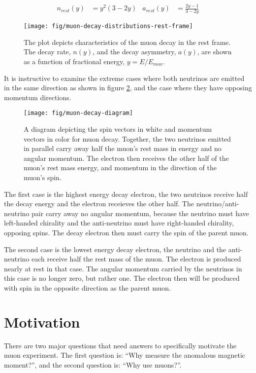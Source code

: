 \begin{align}
\label{eqn:muon-decay-rest-frame}
n_{rest}(y) & = y^2(3 - 2 y) & a_{rest}(y) & = \frac{2 y - 1}{3 - 2y}
\end{align}

\begin{figure}
\centering
\texttt{[image: fig/muon-decay-distributions-rest-frame]}
\caption{
    The plot depicts characteristics of the muon decay in the rest frame.  The decay rate, $n(y)$, and the decay asymmetry, $a(y)$, are shown as a function of fractional energy, $y=E/E_{max}$.
    \label{fig:muon-decay-rest-frame}
}
\end{figure}

It is instructive to examine the extreme cases where both neutrinos are emitted in the same direction as shown in figure \ref{fig:muon-decay-diagram}, and the case where they have opposing momentum directions. 

\begin{figure}
\centering
\texttt{[image: fig/muon-decay-diagram]}
\caption{
    A diagram depicting the spin vectors in white and momentum vectors in color for muon decay. Together, the two neutrinos emitted in parallel carry away half the muon's rest mass in energy and no angular momentum.  The electron then receives the other half of the muon's rest mass energy, and momentum in the direction of the muon's spin. 
    \label{fig:muon-decay-diagram}
}
\end{figure}

The first case is the highest energy decay electron, the two neutrinos receive half the decay energy and the electron receieves the other half.  The neutrino/anti-neutrino pair carry away no angular momentum, because the neutrino must have left-handed chirality and the anti-neutrino must have right-handed chirality, opposing spins.  The decay electron then must carry the spin of the parent muon.

The second case is the lowest energy decay electron, the neutrino and the anti-neutrino each receive half the rest mass of the muon.  The electron is produced nearly at rest in that case.  The angular momentum carried by the neutrinos in this case is no longer zero, but rather one.  The electron then will be produced with spin in the opposite direction as the parent muon.

\section{Motivation}
There are two major questions that need answers to specifically motivate the muon \gmtwo experiment.  The first question is: ``Why measure the anomalous magnetic moment?'', and the second question is: ``Why use muons?''.

